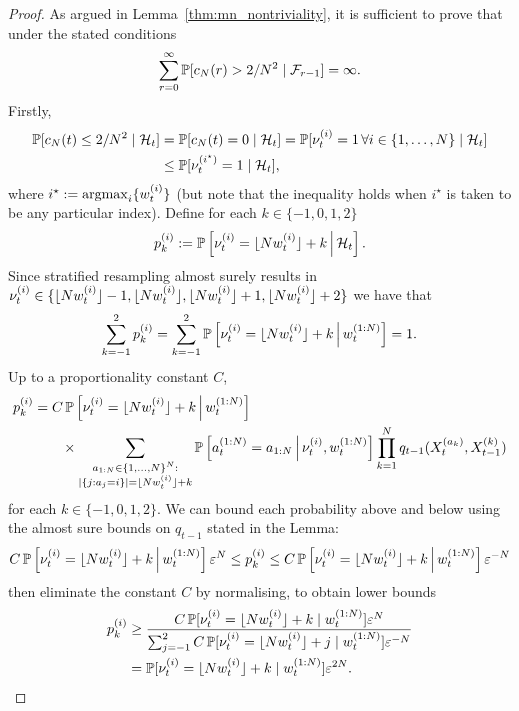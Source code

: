 \begin{proof}
As argued in Lemma~\ref{thm:mn_nontriviality}, it is sufficient to prove that under the stated conditions
\begin{equation*}
\sum_{r=0}^\infty \mathbb{P}[ c_N(r) > 2/N^2  \mid \mathcal{F}_{r-1} ] = \infty .
\end{equation*}
Firstly,
\begin{align}
\mathbb{P}[ c_N(t) \leq 2/N^2 \mid \mathcal{H}_t ]
&= \mathbb{P}[ c_N(t) =0 \mid \mathcal{H}_t ]
= \mathbb{P}[ \nu_t^{(i)} =1 \,\forall i\in\{1,\dots,N\} \mid \mathcal{H}_t ] \notag\\
&\leq \mathbb{P}[ \nu_t^{(i^\star)} =1 \mid \mathcal{H}_t ] , \label{eq:cNnonzero}
\end{align}
where $i^\star := \operatorname*{argmax}_i \{ w_t^{(i)} \}$ (but note that the inequality holds when $i^\star$ is taken to be any particular index).
Define for each $k\in\{-1,0,1,2\}$
\begin{equation*}
p_k^{(i)} := \mathbb{P} \left[ \nu_t^{(i)} = \lfloor N w_t^{(i)} \rfloor + k \,\middle|\, \mathcal{H}_t \right] .
\end{equation*}
Since stratified resampling almost surely results in $\nu_t^{(i)} \in \{ \lfloor N w_t^{(i)} \rfloor-1, \lfloor N w_t^{(i)} \rfloor, \lfloor N w_t^{(i)} \rfloor+1, \lfloor N w_t^{(i)} \rfloor+2 \}$ we have that
\begin{equation*}
\sum_{k=-1}^2 p_k^{(i)} 
= \sum_{k=-1}^2 \mathbb{P} \left[ \nu_t^{(i)} = \lfloor N w_t^{(i)} \rfloor + k \,\middle|\, w_t^{(1:N)} \right]
= 1 .
\end{equation*}
Up to a proportionality constant $C$,
\begin{align*}
p_k^{(i)} 
&= C \, \mathbb{P} \left[ \nu_t^{(i)} = \lfloor N w_t^{(i)} \rfloor + k \,\middle|\, w_t^{(1:N)} \right] \\
    &\qquad \times \sum_{\substack{a_{1:N} \in \{1,\dots,N\}^N : 
        \\ |\{j: a_j=i\}|=\lfloor N w_t^{(i)} \rfloor +k }}
        \mathbb{P}\left[ a_t^{(1:N)} = a_{1:N} \,\middle|\, \nu_t^{(i)}, w_t^{(1:N)} \right]
        \prod_{k=1}^N q_{t-1}( X_t^{(a_k)}, X_{t-1}^{(k)} ) 
\end{align*}
for each $k\in\{-1,0,1,2\}$.
We can bound each probability above and below using the almost sure bounds on $q_{t-1}$ stated in the Lemma:
\begin{equation*}
C \, \mathbb{P} \left[ \nu_t^{(i)} = \lfloor N w_t^{(i)} \rfloor + k \,\middle|\, w_t^{(1:N)} \right] \varepsilon^N
\leq p_k^{(i)}
\leq C \, \mathbb{P} \left[ \nu_t^{(i)} = \lfloor N w_t^{(i)} \rfloor + k \,\middle|\, w_t^{(1:N)} \right] \varepsilon^{-N}
\end{equation*}
then eliminate the constant $C$ by normalising, to obtain lower bounds
\begin{align}
p_k^{(i)} 
&\geq \frac{ C \, \mathbb{P} [ \nu_t^{(i)} = \lfloor N w_t^{(i)} \rfloor + k \mid w_t^{(1:N)} ] \varepsilon^N }{
        \sum_{j=-1}^2 C \, \mathbb{P} [ \nu_t^{(i)} = \lfloor N w_t^{(i)} \rfloor + j \mid w_t^{(1:N)} ] 
        \varepsilon^{-N} } \notag\\
&= \mathbb{P} [ \nu_t^{(i)} = \lfloor N w_t^{(i)} \rfloor + k \mid w_t^{(1:N)} ] \varepsilon^{2N} 
        . \label{eq:strat_pbounds}
\end{align}


\end{proof}
